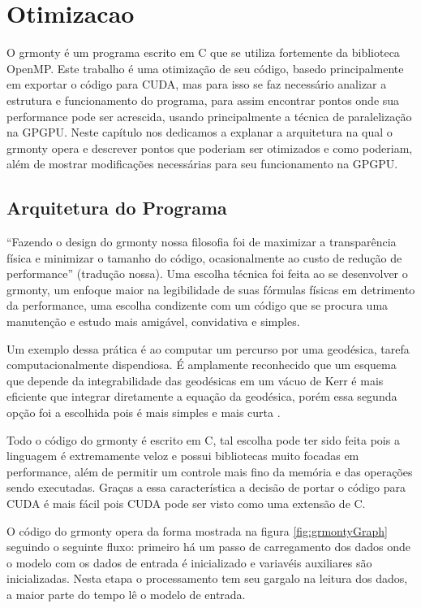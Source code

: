 \chapter{Otimizacao}
\label{cap:otimizacao}
  O grmonty é um programa escrito em C que se utiliza fortemente da biblioteca OpenMP.
  Este trabalho é uma otimização de seu código, basedo principalmente em exportar
  o código para CUDA, mas para isso se faz necessário analizar a estrutura e
  funcionamento do programa, para assim encontrar pontos onde sua performance
  pode ser acrescida, usando principalmente a técnica de paralelização na GPGPU.
  Neste capítulo nos dedicamos a explanar a arquitetura na qual o grmonty opera
  e descrever pontos que poderiam ser otimizados e como poderiam, além de mostrar
  modificações necessárias para seu funcionamento na GPGPU.

\section{Arquitetura do Programa}
  ``Fazendo o design do grmonty nossa filosofia foi de maximizar a transparência
  física e minimizar o tamanho do código, ocasionalmente ao custo de redução de
  performance'' \citep{Dolence:09} (tradução nossa). Uma escolha técnica foi feita
  ao se desenvolver o grmonty, um enfoque maior na legibilidade de suas fórmulas
  físicas em detrimento da performance, uma escolha condizente com um
  código que se procura uma manutenção e estudo mais amigável, convidativa e simples.

  Um exemplo dessa prática é ao computar um percurso por uma geodésica, tarefa
  computacionalmente dispendiosa. É amplamente reconhecido \citep{ynogkm:13} que
  um esquema que depende da integrabilidade das geodésicas em um vácuo de Kerr é
  mais eficiente que integrar diretamente a equação da geodésica, porém essa segunda
  opção foi a escolhida pois é mais simples e mais curta \citep{Dolence:09}.

  Todo o código do grmonty é escrito em C, tal escolha pode ter sido feita pois
  a linguagem é extremamente veloz e possui bibliotecas muito focadas em performance, além de permitir um controle mais fino da memória e das
  operações sendo executadas. Graças a essa característica a decisão de portar o
  código para CUDA é mais fácil pois CUDA pode ser visto como uma extensão de C.

  O código do grmonty opera da forma mostrada na figura \ref{fig:grmontyGraph} seguindo o seguinte fluxo: primeiro há um passo de carregamento dos dados onde o modelo com os dados de entrada é inicializado e variavéis auxiliares são inicializadas. Nesta etapa o processamento tem seu gargalo na leitura dos dados, a maior parte do tempo lê o modelo de entrada.

